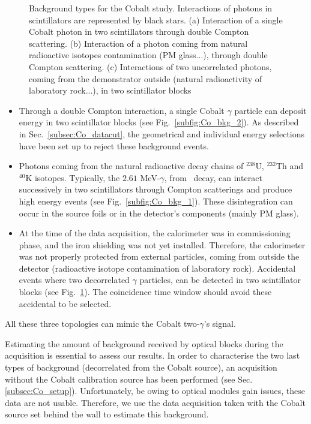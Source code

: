 \begin{figure}[h]
\begin{subfigure}[t]{0.30\textwidth}
    \captionsetup{justification=justified}
    \caption{
      \label{subfig:Co_bkg_3}}
  \end{subfigure}
  \caption{Background types for the Cobalt study.
    Interactions of photons in scintillators are represented by black stars.
    (a) Interaction of a single Cobalt photon in two scintillators through double Compton scattering.
    (b) Interaction of a photon coming from natural radioactive isotopes contamination (PM glass...), through double Compton scattering.
    (c) Interactions of two uncorrelated photons, coming from the demonstrator outside (natural radioactivity of laboratory rock...), in two scintillator blocks
    \label{fig:Co_bkg}}
\end{figure}
\begin{itemize}
\item Through a double Compton interaction, a single Cobalt $\gamma$ particle can deposit energy in two scintillator blocks (see Fig.~\ref{subfig:Co_bkg_2}).
As described in Sec.~\ref{subsec:Co_datacut}, the geometrical and individual energy selections have been set up to reject these background events.
\item Photons coming from the natural radioactive decay chains of $^{238}$U, $^{232}$Th and $^{40}$K isotopes.
Typically, the $2.61$ MeV-$\gamma$, from \Tl\ decay, can interact successively in two scintillators through Compton scatterings and produce high energy events (see Fig.~\ref{subfig:Co_bkg_1}).
These disintegration can occur in the source foils or in the detector's components (mainly PM glass).
\item At the time of the data acquisition, the calorimeter was in commissioning phase, and the iron shielding was not yet installed.
Therefore, the calorimeter was not properly protected from external particles, coming from outside the detector (radioactive isotope contamination of laboratory rock).
Accidental events where two decorrelated $\gamma$ particles, can be detected in two scintillator blocks (see Fig.~\ref{subfig:Co_bkg_3}).
The coincidence time window should avoid these accidental to be selected.
\end{itemize}
All these three topologies can mimic the Cobalt two-$\gamma$'s signal.

Estimating the amount of background received by optical blocks during the acquisition is essential to assess our results.
In order to characterise the two last types of background (decorrelated from the Cobalt source), an acquisition without the Cobalt calibration source has been performed (see Sec.\ref{subsec:Co_setup}).
Unfortunately, be owing to optical modules gain issues, these data are not usable.
Therefore, we use the data acquisition taken with the Cobalt source set behind the wall to estimate this background.

